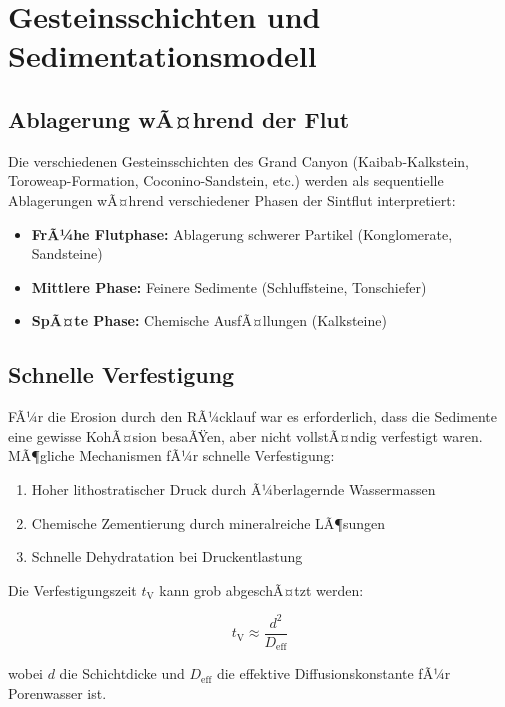 ﻿\documentclass[12pt,a4paper]{report}
\begin{document}
\chapter{Gesteinsschichten und Sedimentationsmodell}

\section{Ablagerung wÃ¤hrend der Flut}

Die verschiedenen Gesteinsschichten des Grand Canyon (Kaibab-Kalkstein, Toroweap-Formation, Coconino-Sandstein, etc.) werden als sequentielle Ablagerungen wÃ¤hrend verschiedener Phasen der Sintflut interpretiert:

\begin{itemize}
	\item \textbf{FrÃ¼he Flutphase:} Ablagerung schwerer Partikel (Konglomerate, Sandsteine)
	\item \textbf{Mittlere Phase:} Feinere Sedimente (Schluffsteine, Tonschiefer)
	\item \textbf{SpÃ¤te Phase:} Chemische AusfÃ¤llungen (Kalksteine)
\end{itemize}

\section{Schnelle Verfestigung}

FÃ¼r die Erosion durch den RÃ¼cklauf war es erforderlich, dass die Sedimente eine gewisse KohÃ¤sion besaÃŸen, aber nicht vollstÃ¤ndig verfestigt waren. MÃ¶gliche Mechanismen fÃ¼r schnelle Verfestigung:

\begin{enumerate}
	\item Hoher lithostratischer Druck durch Ã¼berlagernde Wassermassen
	\item Chemische Zementierung durch mineralreiche LÃ¶sungen
	\item Schnelle Dehydratation bei Druckentlastung
\end{enumerate}

Die Verfestigungszeit $t_{\text{V}}$ kann grob abgeschÃ¤tzt werden:

\begin{equation}
	t_{\text{V}} \approx \frac{d^2}{D_{\text{eff}}}
\end{equation}

wobei $d$ die Schichtdicke und $D_{\text{eff}}$ die effektive Diffusionskonstante fÃ¼r Porenwasser ist.
\end{document}
